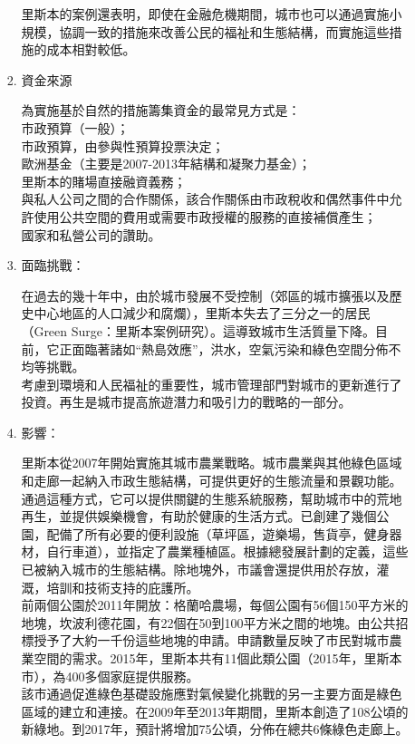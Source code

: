 \documentclass[a4paper,12pt]{article}
\begin{document}
\begin{enumerate}
\begin{enumerate}
\begin{enumerate}
里斯本的案例還表明，即使在金融危機期間，城市也可以通過實施小規模，協調一致的措施來改善公民的福祉和生態結構，而實施這些措施的成本相對較低。\\
\item 資金來源
\label{sec:org9e084a3}

為實施基於自然的措施籌集資金的最常見方式是：\\

市政預算（一般）；\\
市政預算，由參與性預算投票決定；\\
歐洲基金（主要是2007-2013年結構和凝聚力基金）；\\
里斯本的賭場直接融資義務；\\
與私人公司之間的合作關係，該合作關係由市政稅收和偶然事件中允許使用公共空間的費用或需要市政授權的服務的直接補償產生；\\
國家和私營公司的讚助。\\
\item 面臨挑戰：
\label{sec:org4b977a5}

在過去的幾十年中，由於城市發展不受控制（郊區的城市擴張以及歷史中心地區的人口減少和腐爛），里斯本失去了三分之一的居民（Green Surge：里斯本案例研究）。這導致城市生活質量下降。目前，它正面臨著諸如“熱島效應”，洪水，空氣污染和綠色空間分佈不均等挑戰。\\

考慮到環境和人民福祉的重要性，城市管理部門對城市的更新進行了投資。再生是城市提高旅遊潛力和吸引力的戰略的一部分。\\
\item 影響：
\label{sec:orgefde0ec}

里斯本從2007年開始實施其城市農業戰略。城市農業與其他綠色區域和走廊一起納入市政生態結構，可提供更好的生態流量和景觀功能。通過這種方式，它可以提供關鍵的生態系統服務，幫助城市中的荒地再生，並提供娛樂機會，有助於健康的生活方式。已創建了幾個公園，配備了所有必要的便利設施（草坪區，遊樂場，售貨亭，健身器材，自行車道），並指定了農業種植區。根據總發展計劃的定義，這些已被納入城市的生態結構。除地塊外，市議會還提供用於存放，灌溉，培訓和技術支持的庇護所。\\

前兩個公園於2011年開放：格蘭哈農場，每個公園有56個150平方米的地塊，坎波利德花園，有22個在50到100平方米之間的地塊。由公共招標授予了大約一千份這些地塊的申請。申請數量反映了市民對城市農業空間的需求。2015年，里斯本共有11個此類公園（2015年，里斯本市），為400多個家庭提供服務。\\

該市通過促進綠色基礎設施應對氣候變化挑戰的另一主要方面是綠色區域的建立和連接。在2009年至2013年期間，里斯本創造了108公頃的新綠地。到2017年，預計將增加75公頃，分佈在總共6條綠色走廊上。\\


\end{enumerate}
\end{enumerate}
\end{enumerate}
\end{document}
